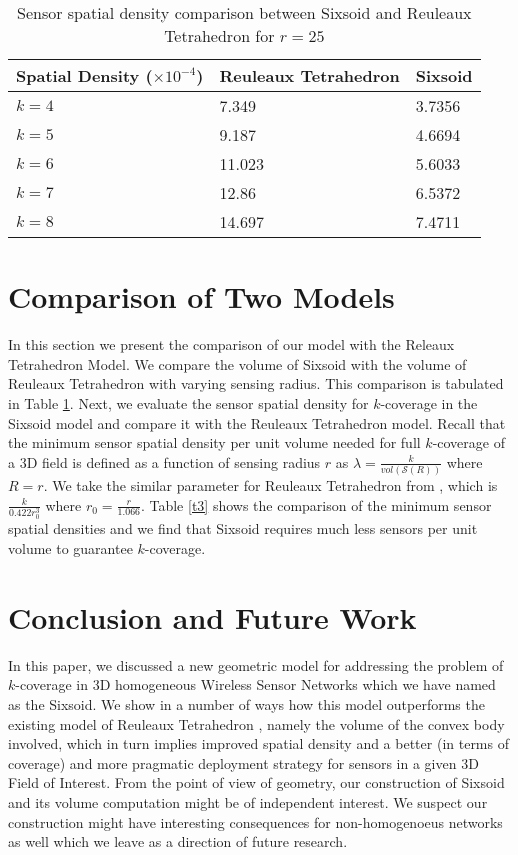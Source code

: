 \documentclass[conference]{IEEEtran}
\begin{document}
\begin{table}
\small
 \caption{Sensor spatial density comparison between Sixsoid and Reuleaux Tetrahedron for $r = 25$}
\label{t2}
\begin{center}
    \begin{tabular}{ | l | l | l |}
    \hline
    Spatial Density ($\times 10^{-4}$)  & Reuleaux Tetrahedron & Sixsoid  \\ \hline
    $k = 4$  &7.349 &  3.7356   \\ \hline          
    $k = 5$  &9.187 & 4.6694  \\ \hline
    $k = 6$  &11.023 & 5.6033  \\ \hline
    $k = 7$  &12.86 & 6.5372  \\ \hline
    $k = 8$  &14.697 & 7.4711  \\ \hline
    \end{tabular}
\end{center}
\end{table}


\section{Comparison of Two Models}
In this section we present the comparison of our model with the Releaux Tetrahedron Model.
We compare the volume of Sixsoid with the volume of Reuleaux Tetrahedron with varying sensing radius. This comparison is tabulated in Table \ref{t2}. Next, we evaluate the sensor spatial density for $k$-coverage in the Sixsoid model and compare it with the Reuleaux Tetrahedron model. Recall that the minimum sensor spatial density per unit volume needed for full $k$-coverage of a 3D field is defined as a function of sensing radius $r$ as $\lambda = \frac{k}{vol(\mathcal{S}(R))}$ where $R = r$. We take the similar parameter for Reuleaux Tetrahedron from \cite{A,AD1}, which is $\frac{k}{0.422r_0^3}$ where $r_0 = \frac{r}{1.066}$. Table \ref{t3} shows the comparison of the minimum sensor spatial densities and we find that Sixsoid requires much less sensors per unit volume to guarantee $k$-coverage.   


\section{Conclusion and Future Work}
In this paper, we discussed a new geometric model for addressing the 
problem of $k$-coverage in 3D homogeneous Wireless Sensor Networks
which we have named as the Sixsoid. We show
in a number of ways how this model outperforms the existing model of Reuleaux 
Tetrahedron \cite{A,AD1}, namely the volume of the convex body involved,
which in turn implies improved spatial density and a better (in terms of coverage)
and more pragmatic deployment strategy for sensors in a given 3D Field of Interest. 
From the point of view of geometry, our construction of Sixsoid and its volume computation 
might be of independent interest. We suspect our construction might have interesting
consequences for non-homogenoeus networks as well which we leave as a direction of future research. 
   
\end{document}
